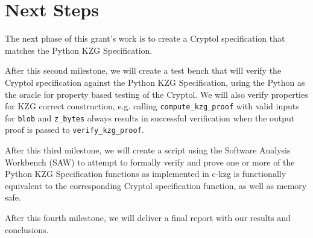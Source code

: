 \documentclass[12pt]{galois-whitepaper}
\begin{document}
\clearpage

\section{Next Steps}
The next phase of this grant's work is to create a Cryptol specification that matches the Python KZG Specification.

After this second milestone, we will create a test bench that will verify the Cryptol specification against the Python KZG Specification,
using the Python as the oracle for property based testing of the Cryptol. We will also verify properties for KZG correct construction,
e.g. calling \texttt{compute\_kzg\_proof} with valid inputs for \texttt{blob} and \texttt{z\_bytes} always results in successful
verification when the output proof is passed to \texttt{verify\_kzg\_proof}.

After this third milestone, we will create a script using the Software Analysis Workbench (SAW) to attempt to formally verify and
prove one or more of the Python KZG Specification functions as implemented in c-kzg is functionally equivalent to the corresponding Cryptol
specification function, as well as memory safe.

After this fourth milestone, we will deliver a final report with our results and conclusions.
\end{document}
